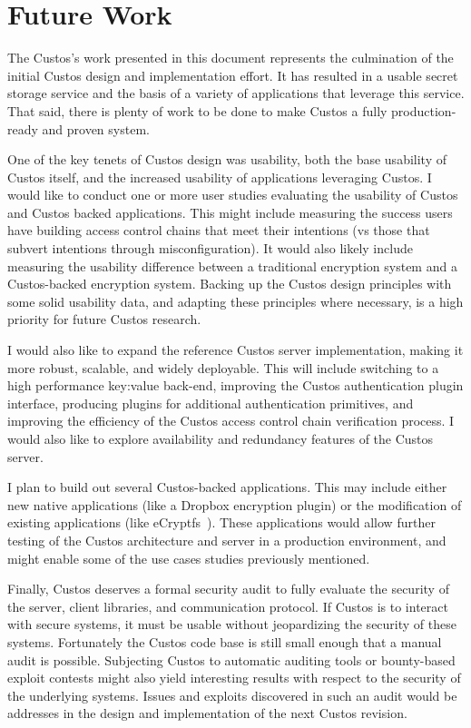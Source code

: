 \section{Future Work}

The Custos's work presented in this document represents the
culmination of the initial Custos design and implementation effort. It
has resulted in a usable secret storage service and the basis of a
variety of applications that leverage this service. That said, there
is plenty of work to be done to make Custos a fully production-ready
and proven system.

One of the key tenets of Custos design was usability, both the base
usability of Custos itself, and the increased usability of
applications leveraging Custos. I would like to conduct one or more
user studies evaluating the usability of Custos and Custos backed
applications. This might include measuring the success users have
building access control chains that meet their intentions (vs those
that subvert intentions through misconfiguration). It would also
likely include measuring the usability difference between a
traditional encryption system and a Custos-backed encryption
system. Backing up the Custos design principles with some solid
usability data, and adapting these principles where necessary, is a
high priority for future Custos research.

I would also like to expand the reference Custos server
implementation, making it more robust, scalable, and widely
deployable. This will include switching to a high performance
key:value back-end, improving the Custos authentication plugin
interface, producing plugins for additional authentication primitives,
and improving the efficiency of the Custos access control chain
verification process. I would also like to explore availability and
redundancy features of the Custos server.

I plan to build out several Custos-backed applications. This may
include either new native applications (like a Dropbox\cite{dropbox}
encryption plugin) or the modification of existing applications (like
eCryptfs~\cite{eCryptfs}). These applications would allow further
testing of the Custos architecture and server in a production
environment, and might enable some of the use cases studies previously
mentioned.

Finally, Custos deserves a formal security audit to fully evaluate the
security of the server, client libraries, and communication
protocol. If Custos is to interact with secure systems, it must be
usable without jeopardizing the security of these systems. Fortunately
the Custos code base is still small enough that a manual audit is
possible. Subjecting Custos to automatic auditing tools or
bounty-based exploit contests might also yield interesting results
with respect to the security of the underlying systems. Issues and
exploits discovered in such an audit would be addresses in the design
and implementation of the next Custos revision.

